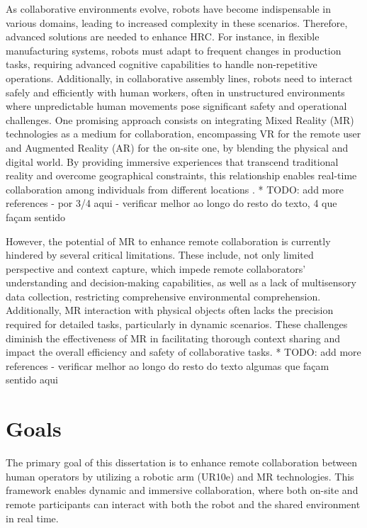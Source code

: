 As collaborative environments evolve, robots have become indispensable in various domains, leading to increased complexity in these scenarios. Therefore, advanced solutions are needed to enhance \ac{HRC}. For instance, in flexible manufacturing systems, robots must adapt to frequent changes in production tasks, requiring advanced cognitive capabilities to handle non-repetitive operations. Additionally, in collaborative assembly lines, robots need to interact safely and efficiently with human workers, often in unstructured environments where unpredictable human movements pose significant safety and operational challenges. One promising approach consists on integrating Mixed Reality (\ac{MR}) technologies as a medium for collaboration, encompassing \ac{VR} for the remote user and Augmented Reality (\ac{AR}) for the on-site one, by blending the physical and digital world. By providing immersive experiences that transcend traditional reality and overcome geographical constraints, this relationship enables real-time collaboration among individuals from different locations \cite{whatismixedreality}.
* TODO: add more references - por 3/4 aqui - verificar melhor ao longo do resto do texto, 4 que façam sentido

However, the potential of \ac{MR} to enhance remote collaboration is currently hindered by several critical limitations. These include, not only limited perspective and context capture, which impede remote collaborators' understanding and decision-making capabilities, as well as a lack of multisensory data collection, restricting comprehensive environmental comprehension. 
Additionally, \ac{MR} interaction with physical objects often lacks the precision required for detailed tasks, particularly in dynamic scenarios. These challenges diminish the effectiveness of \ac{MR} in facilitating thorough context sharing and impact the overall efficiency and safety of 
collaborative tasks.
* TODO: add more references - verificar melhor ao longo do resto do texto algumas que façam sentido aqui

\FloatBarrier

\section{Goals}
\label{section:Goals}
% 

The primary goal of this dissertation is to enhance remote collaboration between human operators by utilizing a robotic arm (UR10e) and \ac{MR} technologies. This framework enables dynamic and immersive collaboration, where both on-site and remote participants can interact with both the robot and the shared environment in real time. 

